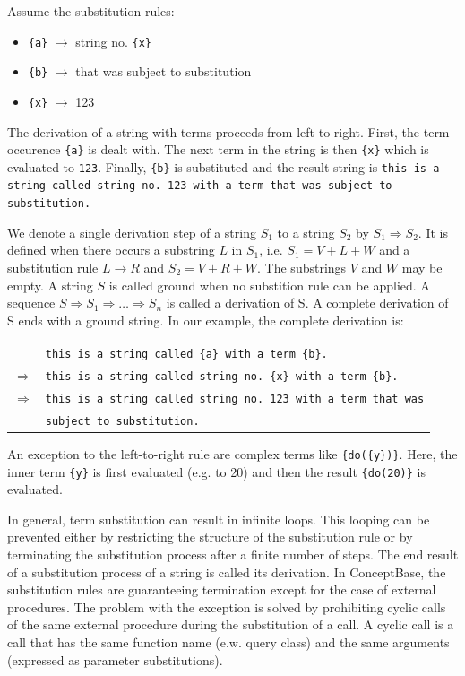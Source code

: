 Assume the substitution rules:

\begin{itemize}
\item \verb+{a}+ $\longrightarrow$ string no. \verb+{x}+
\item \verb+{b}+ $\longrightarrow$ that was subject to substitution
\item \verb+{x}+ $\longrightarrow$ 123
\end{itemize}

The derivation of a string with terms proceeds from left to right. First, the term occurence \verb+{a}+ is dealt with. The next term in the string is then \verb+{x}+
which is evaluated to \verb+123+. Finally, \verb+{b}+ is substituted and the result string is
{\tt this is a string called string no.\ 123 with a term that was subject to substitution.}

We denote a single derivation step of a string $S_1$ to a string $S_2$ by $S_1 \Longrightarrow S_2$. It is defined when there occurs a substring $L$ in $S_1$, i.e.
$S_1=V+L+W$ and a substitution rule $ L \longrightarrow R$ and $S_2=V+R+W$. The substrings $V$ and $W$ may be empty. A string $S$ is called ground when no
substition rule can be applied. A sequence $ S \Longrightarrow S_1 \Longrightarrow \ldots \Longrightarrow S_n$ is called a derivation of S. A complete derivation of S ends with a
ground string. In our example, the complete derivation is:


\begin{tabular}{rl}
     & {\tt this is a string called \verb+{a}+ with a term \verb+{b}+.}\\
 $\Longrightarrow$ & {\tt this is a string called string no.\ \verb+{x}+ with a term \verb+{b}+.}  \\
 $\Longrightarrow$ & {\tt this is a string called string no.\ 123 with a term that was} \\
  &  {\tt subject to substitution.} \\
\end{tabular}

An exception to the left-to-right rule are complex terms like \verb+{do({y})}+. Here, the inner term \verb+{y}+ is first evaluated (e.g. to 20) and then the result \verb+{do(20)}+ is evaluated.

In general, term substitution can result in infinite loops. This looping can be prevented either by restricting the structure of the substitution rule or
by terminating the substitution process after a finite number of steps. The end result of a substitution process of a string is called its derivation. In
ConceptBase, the substitution rules are guaranteeing termination except for the case of external procedures. The problem with the exception is
solved by prohibiting cyclic calls of the same external procedure during the substitution of
a call.
A cyclic call is a call that has the same function name (e.w. query class) and
the same arguments (expressed as parameter substitutions).


